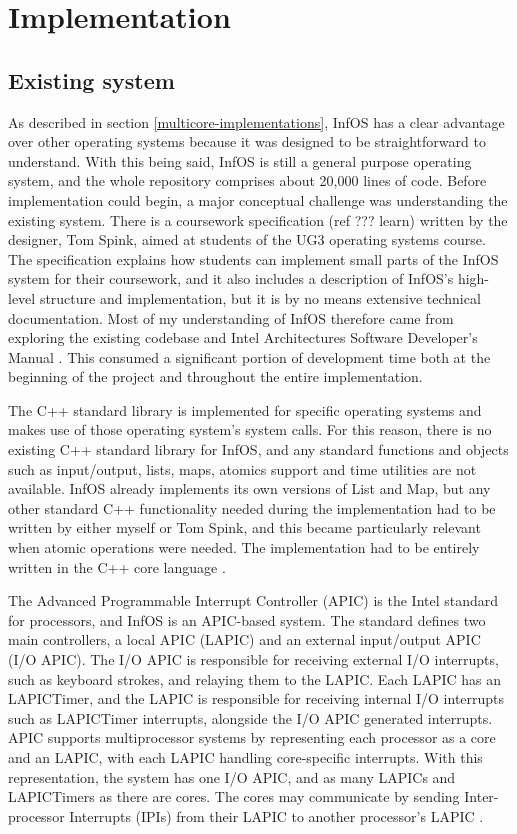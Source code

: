 \documentclass[bsc,frontabs,twoside,singlespacing,parskip,deptreport]{infthesis}     %
\begin{document}
\chapter{Implementation} \label{implementation}

\section{Existing system} \label{existing-system}
As described in section \ref{multicore-implementations}, InfOS has a clear advantage over other operating systems because it was designed to be straightforward to understand. With this being said, InfOS is still a general purpose operating system, and the whole repository comprises about 20,000 lines of code. Before implementation could begin, a major conceptual challenge was understanding the existing system. There is a coursework specification (ref ??? learn) written by the designer, Tom Spink, aimed at students of the UG3 operating systems course. The specification explains how students can implement small parts of the InfOS system for their coursework, and it also includes a description of InfOS’s high-level structure and implementation, but it is by no means extensive technical documentation. Most of my understanding of InfOS therefore came from exploring the existing codebase and Intel Architectures Software Developer’s Manual \cite{intel-full-manual}. This consumed a significant portion of development time both at the beginning of the project and throughout the entire implementation.

The C++ standard library is implemented for specific operating systems and makes use of those operating system’s system calls. For this reason, there is no existing C++ standard library for InfOS, and any standard functions and objects such as input/output, lists, maps, atomics support and time utilities are not available. InfOS already implements its own versions of List and Map, but any other standard C++ functionality needed during the implementation had to be written by either myself or Tom Spink, and this became particularly relevant when atomic operations were needed. The implementation had to be entirely written in the C++ core language \cite{cpp-core}.
 
The Advanced Programmable Interrupt Controller (APIC) \cite{intel-sys-prog-guide} is the Intel standard for processors, and InfOS is an APIC-based system. The standard defines two main controllers, a local APIC (LAPIC) and an external input/output APIC (I/O APIC). The I/O APIC is responsible for receiving external I/O interrupts, such as keyboard strokes, and relaying them to the LAPIC. Each LAPIC has an LAPICTimer, and the LAPIC is responsible for receiving internal I/O interrupts such as LAPICTimer interrupts, alongside the I/O APIC generated interrupts. APIC supports multiprocessor systems by representing each processor as a core and an LAPIC, with each LAPIC handling core-specific interrupts. With this representation, the system has one I/O APIC, and as many LAPICs and LAPICTimers as there are cores. The cores may communicate by sending Inter-processor Interrupts (IPIs) from their LAPIC to another processor’s LAPIC \cite{intel-sys-prog-guide}.
\end{document}
